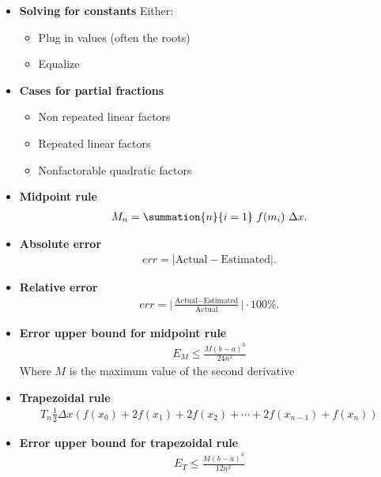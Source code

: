 \documentclass{report}
\begin{document}
\begin{itemize}
        \item \textbf{Solving for constants}
            Either:
            \begin{itemize}
                \item Plug in values (often the roots)
                \item Equalize 
            \end{itemize}
        \item \textbf{Cases for partial fractions}
            \begin{itemize}
                \item Non repeated linear factors
                \item Repeated linear factors
                \item Nonfactorable quadratic factors
            \end{itemize}
        \item \textbf{Midpoint rule}
            \begin{align*}
                M_{n} = \summation{n}{i=1}\ f(m_{i})\ \Delta x 
            .\end{align*}
        \item \textbf{Absolute error}
            \begin{align*}
                err = \bigg|\text{Actual} - \text{Estimated}\bigg|
            .\end{align*}
        \item \textbf{Relative error}
            \begin{align*}
                err = \bigg|\frac{\text{Actual} - \text{Estimated}}{\text{Actual}}\bigg| \cdot 100\%
            .\end{align*}
        \item \textbf{Error upper bound for midpoint rule}
        \begin{align*}
            E_{M} \leq \frac{M(b-a)^3}{24n^2}
        \end{align*}
        Where $M$ is the maximum value of the second derivative
        \item \textbf{Trapezoidal rule}
        \begin{align*}
            T_n \frac{1}{2} \Delta x \left( f(x_0) + 2f(x_1) + 2f(x_2) + \cdots + 2f(x_{n-1}) + f(x_n) \right)
        \end{align*}
        \item \textbf{Error upper bound for trapezoidal rule}
        \begin{align*}
            E_{T} \leq \frac{M(b-a)^3}{12n^2}

\end{align*}
\end{itemize}
\end{document}
